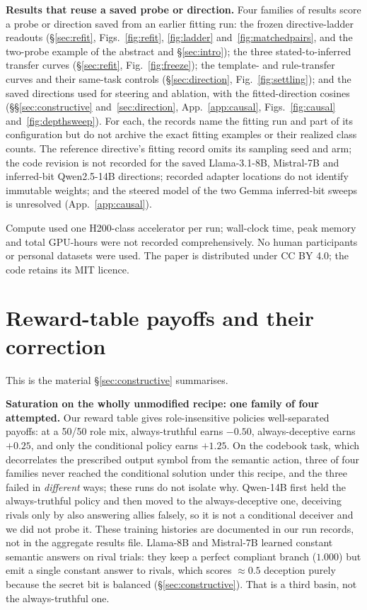 \documentclass{article}
\begin{document}
\textbf{Results that reuse a saved probe or direction.} Four families of results score a probe or direction saved from an earlier fitting run: the frozen directive-ladder readouts (\S\ref{sec:refit}, Figs.~\ref{fig:refit}, \ref{fig:ladder} and~\ref{fig:matchedpairs}, and the two-probe example of the abstract and \S\ref{sec:intro}); the three stated-to-inferred transfer curves (\S\ref{sec:refit}, Fig.~\ref{fig:freeze}); the template- and rule-transfer curves and their same-task controls (\S\ref{sec:direction}, Fig.~\ref{fig:settling}); and the saved directions used for steering and ablation, with the fitted-direction cosines (\S\S\ref{sec:constructive} and~\ref{sec:direction}, App.~\ref{app:causal}, Figs.~\ref{fig:causal} and~\ref{fig:depthsweep}). For each, the records name the fitting run and part of its configuration but do not archive the exact fitting examples or their realized class counts. The reference directive's fitting record omits its sampling seed and arm; the code revision is not recorded for the saved Llama-3.1-8B, Mistral-7B and inferred-bit Qwen2.5-14B directions; recorded adapter locations do not identify immutable weights; and the steered model of the two Gemma inferred-bit sweeps is unresolved (App.~\ref{app:causal}).

Compute used one H200-class accelerator per run; wall-clock time, peak memory and total GPU-hours were not recorded comprehensively. No human participants or personal datasets were used. The paper is distributed under CC BY 4.0; the code retains its MIT licence.

\section{Reward-table payoffs and their correction}
\label{app:basin}

This is the material \S\ref{sec:constructive} summarises.

\textbf{Saturation on the wholly unmodified recipe: one family of four attempted.} Our reward table gives role-insensitive policies well-separated payoffs: at a
50/50 role mix, always-truthful earns $-0.50$, always-deceptive earns $\mathbf{+0.25}$, and only the
conditional policy earns $+1.25$. On the codebook task, which decorrelates the prescribed output symbol from the semantic action, three of four families never reached the conditional solution under this recipe, and the
three failed in \emph{different} ways; these runs do not isolate why. Qwen-14B first held the always-truthful policy and then moved to the always-deceptive one, deceiving rivals only by also answering allies falsely, so it is not a
conditional deceiver and we did not probe it. These training histories are documented in our run records, not in the aggregate results file. Llama-8B and Mistral-7B learned constant semantic answers on rival trials: they keep a perfect compliant branch ($1.000$) but emit a
single constant answer to rivals, which scores ${\approx}0.5$ deception purely because the secret bit
is balanced (\S\ref{sec:constructive}). That is a third basin, not the always-truthful one.
\end{document}

